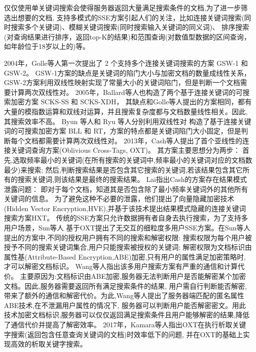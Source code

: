 仅仅使用单关键词搜索会使得服务器返回大量满足搜索条件的文档,为了进一步筛选出想要的文档,
支持多模式的SSE方案引起人们的关注，比如连接关键词搜索(同时搜索多个关键词)、模糊关键词搜索(同时搜索输入关键词的同义词)、
排序搜索(对查询结果进行排序，返回top-K的结果)和范围查询(对数值型数据的区间查询，如年龄位于18岁以上的)等。

2004年，Golle等人第一次提出了 2 个支持多个连接关键词搜索的方案 GSW-1 和 GSW-2。
GSW-1方案的缺点是关键词的陷门大小与加密文档的数量成线性关系，
GSW-2方案利用双线性映射实现了常量大小的关键词陷门，但是判断一个文档需要计算两次双线性对。
2005年，Ballard等人也构造了两个基于连接关键词的可搜索加密方案 SCKS-SS 和 SCKS-XDH，
其缺点和Golle等人提出的方案相同，都有大量的模指数运算和双线对运算，并且搜索复杂度都与文档数量线性相关。因此,其搜索效率不高。
Byun 等人和 Ryu 等人分别利用双线性对
构造了基于连接关键词的可搜索加密方案 BLL 和 RT，方案的特点都是关键词陷门大小固定，但是判断每个文档都需要计算两次双线性对。
2013年，Cash等人提出了首个亚线性的连接关键词查询方案(Oblivious Cross-Tags, OXT)。
其方案主要思想分为两步： 首先,选取频率最小的关键词(在所有搜索的关键词中,频率最小的关键词对应的文档数最少)来搜索;
然后,判断搜索结果是否包含其它搜索的关键词,若该结果包含其它所有的搜索关键词,则该结果是最终的搜索结果。
Lai指出Cash的方案存在结果模式泄露问题：
即对于每个文档，知道其是否包含除了最小频率关键词外的其他所有关键词的信息。
为了避免这种不必要的泄露，他们提出了向量隐藏加密技术(Hidden Vector Encryption,HVE),并基于该技术提出结果模式隐藏的连接关键词搜索方案HXT。
传统的SSE方案只允许数据拥有者自身去执行搜索，为了支持多用户场景，Sun等人
基于OXT提出了无交互的细粒度多用户SSE方案。在Sun等人提出的方案中,不同的授权用户拥有不同的搜索和解密权限:
搜索权限为每个用户被授予不同的搜索关键词集合,用户只能搜索被授权的关键词;
解密权限为文档标识由属性基(Attribute-Based Encryption,ABE)加密,只有用户的属性满足加密策略时,才可以解密文档标识。
Wang等人指出该多用户搜索方案有严重的通信和计算代价。
主要原因为:文档标识由ABE加密,服务器无法判断用户是否能解密某个加密文档。因此,服务器需要返回所有满足搜索条件的结果,
用户需自行判断能否解密,带来了额外的通信和解密代价。为此,Wang等人提出了服务器端匹配的匿名属性ABE技术,在不泄漏用户属性的情况下,
服务器可以判断用户能否解密密文。用此技术加密文档标识,服务器可以仅仅返回满足搜索条件且用户能够解密的结果,降低了通信代价并提高了解密效率。
2017年，Kamara等人指出OXT在执行析取关键字搜索(返回包含任意查询关键词的文档)时效率低下的问题,
并在OXT的基础上实现高效的析取关键字搜索。

